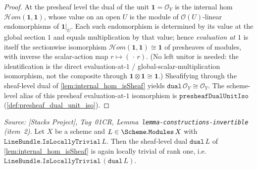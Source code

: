 \begin{proof}
  \leanok
  At the presheaf level the dual of the unit \(\mathbf{1} = \mathcal{O}_Y\) is the internal
  hom \(\mathcal{H}om(\mathbf{1}, \mathbf{1})\), whose value on an open \(U\) is the module
  of \(\mathcal{O}(U)\)-linear endomorphisms of \(\mathbf{1}|_U\). Each such endomorphism is
  determined by its value at the global section \(1\) and equals multiplication by that
  value; hence \emph{evaluation at \(1\)} is itself the sectionwise isomorphism
  \(\mathcal{H}om(\mathbf{1}, \mathbf{1}) \cong \mathbf{1}\) of presheaves of modules, with
  inverse the scalar-action map \(r \mapsto (\,\cdot\,r)\). (No left unitor is needed: the
  identification is the direct evaluation-at-\(1\) / global-scalar-multiplication
  isomorphism, not the composite through \(\mathbf{1} \otimes \mathbf{1} \cong \mathbf{1}\).)
  Sheafifying through the sheaf-level dual of \cref{lem:internal_hom_isSheaf} yields
  \(\mathtt{dual}\,\mathcal{O}_Y \cong \mathcal{O}_Y\). The scheme-level alias of this
  presheaf evaluation-at-\(1\) isomorphism is
  \(\mathtt{presheafDualUnitIso}\) (\cref{def:presheaf_dual_unit_iso}).
\end{proof}

\begin{lemma}





  \label{lem:dual_isLocallyTrivial}
  \textit{Source: [Stacks Project], Tag~01CR,
  Lemma~\texttt{lemma-constructions-invertible} (item~2).}
  Let \(X\) be a scheme and \(L \in \Scheme.\mathtt{Modules}\,X\) with
  \(\mathtt{LineBundle.IsLocallyTrivial}\,L\). Then the sheaf-level dual
  \(\mathtt{dual}\,L\) of \cref{lem:internal_hom_isSheaf} is again locally trivial of
  rank one, i.e.\ \(\mathtt{LineBundle.IsLocallyTrivial}\,(\mathtt{dual}\,L)\).
\end{lemma}

